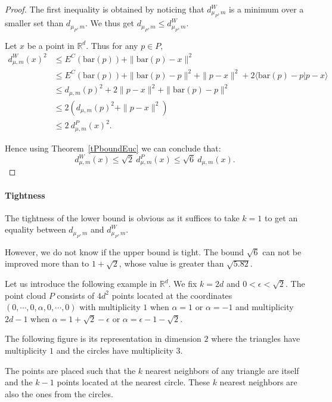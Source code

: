 \documentclass[a4paper]{article}
\newcommand\norm[1]{\|#1\|}
\newcommand\bary[1]{\mathrm{bar}(#1)}
\newcommand\dm{d_{\mu,m}}
\newcommand\dmP{d_{\mu_P,m}}
\newcommand\dPW{d_{\mu_P,m}^W}
\newcommand\R{\mathbb{R}}
\begin{document}
\begin{proof}
The first inequality is obtained by noticing that $\dPW$ is a minimum over a smaller set than $\dmP$.
We thus get $\dmP\leq\dPW$.

Let $x$ be a point in $\mathbb{R}^d$.
Thus for any $p\in P$,
\begin{align*}
\dm^W(x)^2&\leq E^C(\bary{p})+\norm{\bary{p}-x}^2\\
&\leq E^C(\bary{p})+\norm{\bary{p}-p}^2+\norm{p-x}^2+2\langle \bary{p}-p|p-x\rangle\\
&\leq \dm(p)^2+2\norm{p-x}^2+\norm{\bary{p}-p}^2\\
&\leq 2(\dm(p)^2+\norm{p-x}^2)\\
&\leq 2\ \dm^P(x)^2.
\end{align*}

Hence using Theorem~\ref{tPboundEuc} we can conclude that:
$$\dm^W(x)\leq\sqrt{2}\ \dm^P(x)\leq\sqrt{6}\ \dm(x).$$
\end{proof}

\paragraph{Tightness}
The tightness of the lower bound is obvious as it suffices to take $k=1$ to get an equality between $\dmP$ and $\dPW$.

However, we do not know if the upper bound is tight.
The bound $\sqrt{6}$ can not be improved more than to $1+\sqrt{2}$, whose value is greater than $\sqrt{5.82}$.

Let us introduce the following example in $\R^d$. 
We fix $k=2d$ and $0<\epsilon<\sqrt{2}$.
The point cloud $P$ consists of $4d^2$ points located at the coordinates $(0,\cdots,0,\alpha,0,\cdots,0)$ with multiplicity $1$ when $\alpha=1$ or $\alpha=-1$ and multiplicity $2d-1$ when $\alpha=1+\sqrt{2}-\epsilon$ or $\alpha=\epsilon-1-\sqrt{2}$.

The following figure is its representation in dimension $2$ where the triangles have multiplicity $1$ and the circles have multiplicity $3$.
\begin{center}
\end{center}
The points are placed such that the $k$ nearest neighbors of any triangle are itself and the $k-1$ points located at the nearest circle.
These $k$ nearest neighbors are also the ones from the circles.
\end{document}
